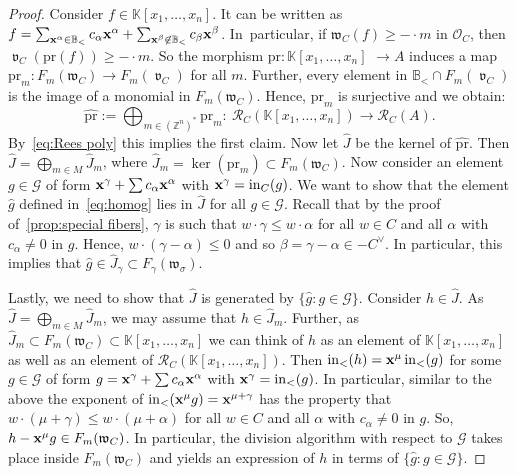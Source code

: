 \documentclass[10pt,a4paper]{amsart}
\newcommand{\thref}[1]{\ref{#1}}
\numberwithin{equation}{section}
\DeclareMathOperator{\init}{in}
\DeclareMathOperator{\val}{\mathfrak v}
\begin{document}
\begin{proof}
Consider $f\in \mathbb K[x_1,\dots,x_n]$.
It can be written as $f=\sum_{{\bf x}^\alpha\in \mathbb B_<} c_\alpha {\bf x}^\alpha+\sum_{{\bf x}^\beta\not\in \mathbb B_<} c_\beta {\bf x}^\beta$.
In~par\-ti\-cular, if $\mathfrak w_C(f)\ge -\cdot m$ in $\mathcal O_C$, then $\val_C(\text{pr}(f))\ge -\cdot m$.
So the morphism $\text{pr}\colon \mathbb K[x_1,\dots,x_n]$ $\to A$ induces a map $\text{pr}_m\colon F_m(\mathfrak w_C)\to F_m(\val_C)$ for all $m$.
Further, every element in $\mathbb B_<\cap F_m(\val_C)$ is the image of a monomial in $F_m(\mathfrak w_C)$.
Hence, $\text{pr}_m$ is surjective and we obtain:
\begin{displaymath}
\widehat{\text{pr}}:=\bigoplus_{m\in (\mathbb Z^n)^*} \text{pr}_m\colon\
\mathcal R_C(\mathbb K[x_1,\dots,x_n])\to \mathcal R_C(A).
\end{displaymath}
By~\eqref{eq:Rees poly} this implies the first claim.
Now let $\hat J$ be the kernel of $\widehat{\text{pr}}$.
Then $\hat J=\bigoplus_{m\in M} \hat J_m $, where $\hat J_m=\ker(\text{pr}_m)\subset F_m(\mathfrak w_C)$.
Now consider an element $g\in \mathcal G$ of form ${\bf x}^\gamma+\sum c_\alpha{\bf x}^\alpha$ with ${\bf x}^\gamma=\init_C(g)$.
We want to show that the element $\hat g$ defined in~\eqref{eq:homog} lies in $\hat J$ for all $g\in \mathcal G$.
Recall that by the proof of~\thref{prop:special fibers}, $\gamma$ is such that $w\cdot \gamma \le w\cdot \alpha $ for all $w\in C$ and all $\alpha$ with $c_\alpha\not =0$ in $g$.
Hence, $ w\cdot (\gamma-\alpha) \le 0$ and so $\beta=\gamma-\alpha\in -C^\vee$.
In particular, this implies that $\hat g\in \hat J_\gamma\subset F_\gamma(\mathfrak w_\sigma)$.

Lastly, we need to show that $\hat J$ is generated by $\{\hat g\colon g\in \mathcal G\}$.
Consider $h\in \hat J$.
As $\hat J=\bigoplus_{m\in M} \hat J_m$, we may assume that $h\in \hat J_m$.
Further, as $\hat J_m\subset F_m(\mathfrak w_C)\subset \mathbb K[x_1,\dots,x_n]$ we can think of $h$ as an element of $\mathbb K[x_1,\dots,x_n]$ as well as an element of $\mathcal R_C(\mathbb K[x_1,\dots,x_n])$.
Then $\init_<(h)={\bf x}^\mu \init_<(g)$ for some $g\in \mathcal G$ of form $g={\bf x}^\gamma+\sum c_\alpha{\bf x}^\alpha$ with ${\bf x}^\gamma=\init_<(g)$.
In particular, similar to the above the exponent of $\init_<({\bf x}^\mu g)={\bf x}^{\mu+\gamma}$ has the property that $w\cdot (\mu+\gamma) \le w\cdot (\mu+\alpha)$ for all $w\in C$ and all $\alpha$ with $c_\alpha\not =0$ in $g$.
So, $h-{\bf x}^{\mu} g\in F_m(\mathfrak w_C)$. %
In particular, the division algorithm with respect to $\mathcal G$ takes place inside $F_m(\mathfrak w_C)$ and yields an expression of $h$ in terms of $\{\hat g\colon g\in \mathcal G \}$.
\end{proof}
\end{document}
